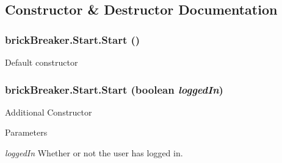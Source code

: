 \subsection{Constructor \& Destructor Documentation}
\hypertarget{classbrick_breaker_1_1_start_a280dfb1c2f596271d773aa1bdb777b20}{
\subsubsection[{Start}]{\setlength{\rightskip}{0pt plus 5cm}brickBreaker.Start.Start ()}}
\label{classbrick_breaker_1_1_start_a280dfb1c2f596271d773aa1bdb777b20}
Default constructor \hypertarget{classbrick_breaker_1_1_start_add9cb12f31b41a4c48a9631e3b813bfc}{
\subsubsection[{Start}]{\setlength{\rightskip}{0pt plus 5cm}brickBreaker.Start.Start (boolean {\em loggedIn})}}
\label{classbrick_breaker_1_1_start_add9cb12f31b41a4c48a9631e3b813bfc}
Additional Constructor 
\begin{DoxyParams}{Parameters}
\item[{\em loggedIn}]Whether or not the user has logged in. \end{DoxyParams}


